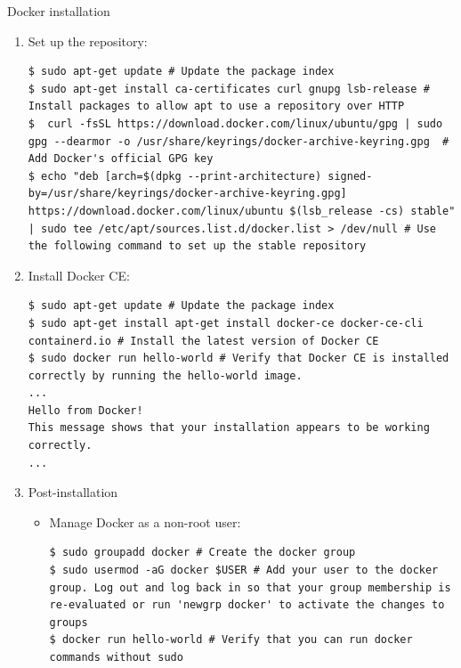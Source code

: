 \begin{frame}{Docker installation}
\begin{enumerate}
 \item Set up the repository:
\begin{lstlisting}[language=shell]
$ sudo apt-get update # Update the package index
$ sudo apt-get install ca-certificates curl gnupg lsb-release # Install packages to allow apt to use a repository over HTTP
$  curl -fsSL https://download.docker.com/linux/ubuntu/gpg | sudo gpg --dearmor -o /usr/share/keyrings/docker-archive-keyring.gpg  # Add Docker's official GPG key
$ echo "deb [arch=$(dpkg --print-architecture) signed-by=/usr/share/keyrings/docker-archive-keyring.gpg] https://download.docker.com/linux/ubuntu $(lsb_release -cs) stable" | sudo tee /etc/apt/sources.list.d/docker.list > /dev/null # Use the following command to set up the stable repository
\end{lstlisting}
 \framebreak
 \item Install Docker CE:
\begin{lstlisting}[language=shell]
$ sudo apt-get update # Update the package index
$ sudo apt-get install apt-get install docker-ce docker-ce-cli containerd.io # Install the latest version of Docker CE
$ sudo docker run hello-world # Verify that Docker CE is installed correctly by running the hello-world image.
...
Hello from Docker!
This message shows that your installation appears to be working correctly.
...
\end{lstlisting}

 \item Post-installation
  \begin{itemize}
   \item Manage Docker as a non-root user:
\begin{lstlisting}[language=shell]
$ sudo groupadd docker # Create the docker group
$ sudo usermod -aG docker $USER # Add your user to the docker group. Log out and log back in so that your group membership is re-evaluated or run 'newgrp docker' to activate the changes to groups
$ docker run hello-world # Verify that you can run docker commands without sudo
\end{lstlisting}
  \end{itemize}
\end{enumerate}
\end{frame}

  
